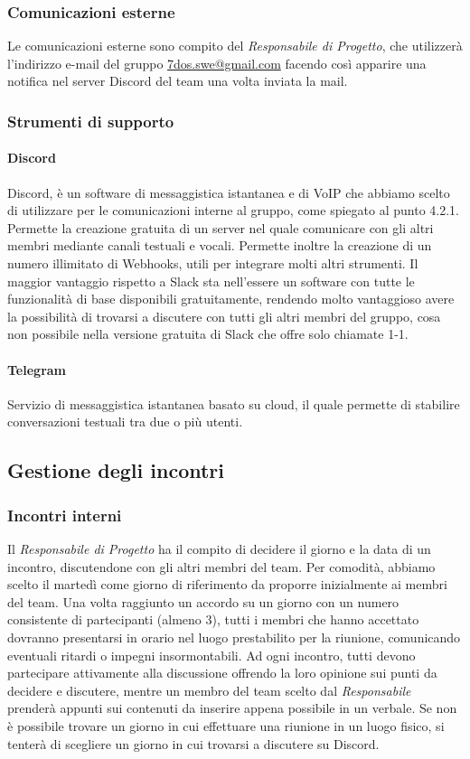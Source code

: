 \subsubsection{Comunicazioni esterne}
Le comunicazioni esterne sono compito del \emph{Responsabile di Progetto}, che utilizzerà l'indirizzo e-mail del gruppo \href{mailto:7dos.swe@gmail.com}{7dos.swe@gmail.com} facendo così apparire una notifica nel server Discord del team una volta inviata la mail.
\subsubsection{Strumenti di supporto}
\paragraph{Discord}\Spazio
Discord, è un software di messaggistica istantanea e di VoIP che abbiamo scelto di utilizzare per le comunicazioni interne al gruppo, come spiegato al punto 4.2.1. Permette la creazione gratuita di un server nel quale comunicare con gli altri membri mediante canali testuali e vocali. Permette inoltre la creazione di un numero illimitato di Webhooks, utili per integrare molti altri strumenti.
Il maggior vantaggio rispetto a Slack sta nell'essere un software con tutte le funzionalità di base disponibili gratuitamente, rendendo molto vantaggioso avere la possibilità di trovarsi a discutere con tutti gli altri membri del gruppo, cosa non possibile nella versione gratuita di Slack che offre solo chiamate 1-1.
\paragraph{Telegram}\Spazio
Servizio di messaggistica istantanea basato su cloud, il quale permette di stabilire conversazioni testuali tra due o più utenti.
\subsection{Gestione degli incontri}
\subsubsection{Incontri interni}
Il \emph{Responsabile di Progetto} ha il compito di decidere il giorno e la data di un incontro, discutendone con gli altri membri del team. Per comodità, abbiamo scelto il martedì come giorno di riferimento da proporre inizialmente ai membri del team.
\newline
Una volta raggiunto un accordo su un giorno con un numero consistente di partecipanti (almeno 3), tutti i membri che hanno accettato dovranno presentarsi in orario nel luogo prestabilito per la riunione, comunicando eventuali ritardi o impegni insormontabili.
Ad ogni incontro, tutti devono partecipare attivamente alla discussione offrendo la loro opinione sui punti da decidere e discutere, mentre un membro del team scelto dal \emph{Responsabile} prenderà appunti sui contenuti da inserire appena possibile in un verbale.
\newline
Se non è possibile trovare un giorno in cui effettuare una riunione in un luogo fisico, si tenterà di scegliere un giorno in cui trovarsi a discutere su Discord.

